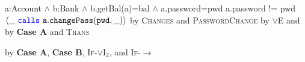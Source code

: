 \begin{proofexample}
{\begin{proofexample}
{{					{a:Account $\wedge$ b:Bank $\wedge$ b.getBal(a)=bal $\wedge$ a.password=pwd}
					{a.password != pwd}
					{$\langle \_\ {\color{blue}\texttt{calls}}\ {\texttt{a}}.{\texttt{changePass}}({\texttt{pwd}}, \_) \rangle$}
					}
				{by \textsc{Changes} and \textsc{PasswordChange}}}
		{
				{by $\vee$E and }}
		{
				{by \textbf{Case A} and \textsc{Trans}}}
	\endproofsteps
	\end{proofexample}
	}
	{
			{by \textbf{Case A}, \textbf{Case B}, \textsc{If-}$\vee$I$_2$, and \textsc{If-}$\longrightarrow$}}
\endproofsteps
\end{proofexample}


